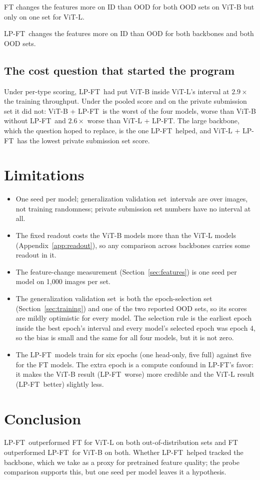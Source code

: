 \documentclass[10pt]{article}
\newcommand{\lpft}{LP-FT}
\newcommand{\genval}{generalization validation set}
\begin{document}
FT changes the features more on ID than OOD for both OOD sets on ViT-B but only on one set for ViT-L.

\lpft\ changes the features more on ID than OOD for both backbones and both OOD sets.

\subsection{The cost question that started the program}
Under per-type scoring, \lpft\ had put ViT-B inside ViT-L's interval at $2.9\times$ the training throughput. Under the pooled score and on the private submission set it did not: ViT-B + \lpft\ is the worst of the four models, worse than ViT-B without \lpft\ and $2.6\times$ worse than ViT-L + \lpft. The large backbone, which the question hoped to replace, is the one \lpft\ helped, and ViT-L + \lpft\ has the lowest private submission set score.

\section{Limitations}
\begin{itemize}
  \item One seed per model; \genval\ intervals are over images, not training randomness; private submission set numbers have no interval at all.
  \item The fixed readout costs the ViT-B models more than the ViT-L models (Appendix~\ref{app:readout}), so any comparison across backbones carries some readout in it.
  \item The feature-change measurement (Section~\ref{sec:features}) is one seed per model on 1,000 images per set.
  \item The \genval\ is both the epoch-selection set (Section~\ref{sec:training}) and one of the two reported OOD sets, so its scores are mildly optimistic for every model. The selection rule is the earliest epoch inside the best epoch's interval and every model's selected epoch was epoch 4, so the bias is small and the same for all four models, but it is not zero.
  \item The \lpft\ models train for six epochs (one head-only, five full) against five for the FT models. The extra epoch is a compute confound in \lpft's favor: it makes the ViT-B result (\lpft\ worse) more credible and the ViT-L result (\lpft\ better) slightly less.
\end{itemize}

\section{Conclusion}
\lpft\ outperformed FT for ViT-L on both out-of-distribution sets and FT outperformed \lpft\ for ViT-B on both. Whether \lpft\ helped tracked the backbone, which we take as a proxy for pretrained feature quality; the probe comparison supports this, but one seed per model leaves it a hypothesis.
\end{document}

